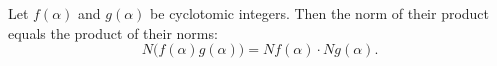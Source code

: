 Let $f(\alpha)$ and $g(\alpha)$ be cyclotomic integers. Then the norm of their product equals the product of their norms:
$$N\bigl(f(\alpha)g(\alpha)\bigr) = Nf(\alpha) \cdot Ng(\alpha).$$
